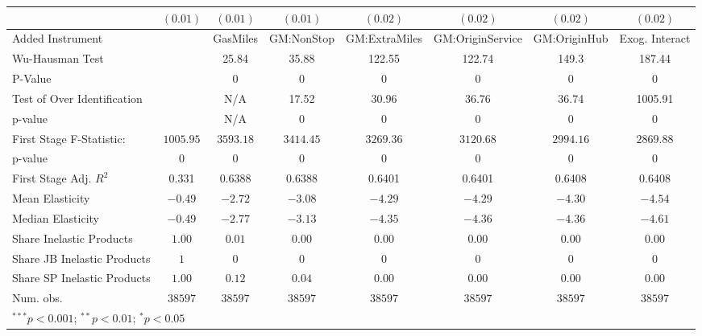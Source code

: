 \begin{tabular}{l c c c c c c c}
                             & $(0.01)$      & $(0.01)$      & $(0.01)$      & $(0.02)$      & $(0.02)$         & $(0.02)$      & $(0.02)$       \\
\midrule
Added Instrument             &               & GasMiles      & GM:NonStop    & GM:ExtraMiles & GM:OriginService & GM:OriginHub  & Exog. Interact \\
Wu-Hausman Test              &               & 25.84         & 35.88         & 122.55        & 122.74           & 149.3         & 187.44         \\
P-Value                      &               & 0             & 0             & 0             & 0                & 0             & 0              \\
Test of Over Identification  &               & N/A           & 17.52         & 30.96         & 36.76            & 36.74         & 1005.91        \\
p-value                      &               & N/A           & 0             & 0             & 0                & 0             & 0              \\
First Stage F-Statistic:     & $1005.95$     & $3593.18$     & $3414.45$     & $3269.36$     & $3120.68$        & $2994.16$     & $2869.88$      \\
p-value                      & $0$           & $0$           & $0$           & $0$           & $0$              & $0$           & $0$            \\
First Stage Adj. $R^2$       & 0.331         & 0.6388        & 0.6388        & 0.6401        & 0.6401           & 0.6408        & 0.6408         \\
Mean Elasticity              & $-0.49$       & $-2.72$       & $-3.08$       & $-4.29$       & $-4.29$          & $-4.30$       & $-4.54$        \\
Median Elasticity            & $-0.49$       & $-2.77$       & $-3.13$       & $-4.35$       & $-4.36$          & $-4.36$       & $-4.61$        \\
Share Inelastic Products     & $1.00$        & $0.01$        & $0.00$        & $0.00$        & $0.00$           & $0.00$        & $0.00$         \\
Share JB Inelastic Products  & $1$           & $0$           & $0$           & $0$           & $0$              & $0$           & $0$            \\
Share SP Inelastic Products  & $1.00$        & $0.12$        & $0.04$        & $0.00$        & $0.00$           & $0.00$        & $0.00$         \\
Num. obs.                    & $38597$       & $38597$       & $38597$       & $38597$       & $38597$          & $38597$       & $38597$        \\
\bottomrule
\multicolumn{8}{l}{\scriptsize{$^{***}p<0.001$; $^{**}p<0.01$; $^{*}p<0.05$}}
\end{tabular}

